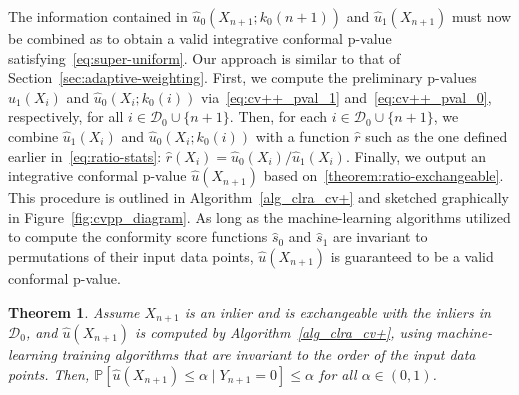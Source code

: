 \documentclass[11pt]{article}
\newtheorem{theorem}{Theorem}
\renewcommand{\P}[1]{\mathbb{P}\left[#1\right]}
\begin{document}
The information contained in $\hat{u}_0(X_{n+1}; k_0(n+1))$ and $\hat{u}_1(X_{n+1})$ must now be combined as to obtain a valid integrative conformal p-value satisfying~\eqref{eq:super-uniform}. Our approach is similar to that of Section~\ref{sec:adaptive-weighting}.
First, we compute the preliminary p-values $\hat{u}_1(X_{i})$ and $\hat{u}_0(X_{i}; k_0(i))$ via~\eqref{eq:cv++_pval_1} and~\eqref{eq:cv++_pval_0}, respectively, for all $i \in \mathcal{D}_0 \cup \{n+1\}$. Then, for each $i \in \mathcal{D}_0 \cup \{n+1\}$, we combine $\hat{u}_1(X_{i})$ and $\hat{u}_0(X_{i}; k_0(i))$ with a function $\hat{r}$ such as the one defined earlier in~\eqref{eq:ratio-stats}: $\hat{r}(X_{i}) = \hat{u}_0(X_{i}) / \hat{u}_1(X_{i})$. Finally, we output an integrative conformal p-value $\hat{u}(X_{n+1})$ based on~\eqref{theorem:ratio-exchangeable}. This procedure is outlined in Algorithm~\ref{alg_clra_cv+} and sketched graphically in Figure~\ref{fig:cvpp_diagram}.
As long as the machine-learning algorithms utilized to compute the conformity score functions $\hat{s}_0$ and $\hat{s}_1$ are invariant to permutations of their input data points, $\hat{u}(X_{n+1})$ is guaranteed to be a valid conformal p-value.

\begin{theorem} \label{theorem:ratio-cv+}
  Assume $X_{n+1}$ is an inlier and is exchangeable with the inliers in $\mathcal{D}_0$, and $\hat{u}(X_{n+1})$ is computed by Algorithm~\ref{alg_clra_cv+}, using machine-learning training algorithms that are invariant to the order of the input data points.
  Then, $\P{\hat{u}(X_{n+1}) \leq \alpha \mid Y_{n+1} = 0} \leq \alpha$ for all $\alpha \in (0,1)$.
\end{theorem}
\end{document}

